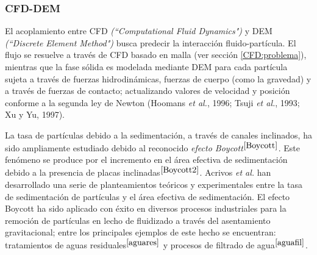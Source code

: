\subsubsection{CFD-DEM}

\noindent
\justify

El acoplamiento entre CFD \textit{(``Computational Fluid Dynamics")} y DEM \textit{(``Discrete Element Method")} busca predecir la interacci\'on fluido-part\'icula. El flujo se resuelve a trav\'es de CFD basado en malla (ver secci\'on \ref{CFD:problema}), mientras que la fase s\'olida es modelada mediante DEM para cada part\'icula sujeta a trav\'es de fuerzas hidrodin\'amicas, fuerzas de cuerpo (como la gravedad) y a trav\'es de fuerzas de contacto; actualizando valores de velocidad y posici\'on conforme a la segunda ley de Newton (Hoomans \textit{et al.}, 1996; Tsuji \textit{et al.}, 1993; Xu y Yu, 1997). 

\noindent
\justify

La tasa de part\'iculas debido a la sedimentaci\'on, a trav\'es de canales inclinados, ha sido ampliamente estudiado debido al reconocido \textit{efecto Boycott}$^{\cite{Boycott}}$. Este fen\'omeno se produce por el incremento en el \'area efectiva de sedimentaci\'on debido a la presencia de placas inclinadas$^{\cite{Boycott2}}$. Acrivos \textit{et al.} han desarrollado una serie de planteamientos te\'oricos y experimentales entre la tasa de sedimentaci\'on de part\'iculas y el \'area efectiva de sedimentaci\'on. El efecto Boycott ha sido aplicado con \'exito en diversos procesos industriales para la remoci\'on de part\'iculas en lecho de fluidizado a trav\'es del asentamiento gravitacional; entre los principales ejemplos de este hecho se encuentran: tratamientos de aguas residuales$^{\cite{aguares}}$ y procesos de filtrado de agua$^{\cite{aguafil}}$.

\noindent
\justify

